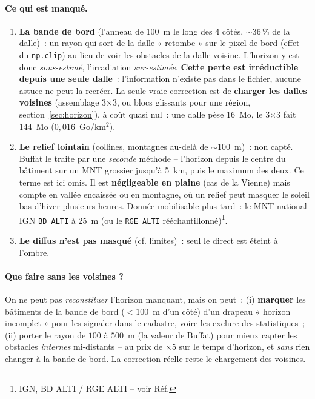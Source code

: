 \documentclass[11pt,a4paper]{article}
\newcommand{\fichier}[1]{\texttt{#1}}
\newcommand{\fonction}[1]{\texttt{#1}}
\begin{document}
\paragraph{Ce qui est manqué.}
\begin{enumerate}
  \item \textbf{La bande de bord} (l'anneau de 100~m le long des 4 côtés,
    $\sim$36\,\% de la dalle)~: un rayon qui sort de la dalle « retombe » sur le
    pixel de bord (effet du \fonction{np.clip}) au lieu de voir les obstacles de
    la dalle voisine. L'horizon y est donc \emph{sous-estimé}, l'irradiation
    \emph{sur-estimée}. \textbf{Cette perte est irréductible depuis une seule
    dalle}~: l'information n'existe pas dans le fichier, aucune astuce ne peut la
    recréer. La seule vraie correction est de \textbf{charger les dalles voisines}
    (assemblage 3$\times$3, ou blocs glissants pour une région,
    section~\ref{sec:horizon}), à coût quasi nul~: une dalle pèse 16~Mo, le
    3$\times$3 fait 144~Mo ($0{,}016$~Go/km$^2$).
  \item \textbf{Le relief lointain} (collines, montagnes au-delà de $\sim$100~m)~:
    non capté. Buffat le traite par une \emph{seconde} méthode -- l'horizon depuis
    le centre du bâtiment sur un MNT grossier jusqu'à 5~km, puis le maximum des
    deux. Ce terme est ici omis. Il est \textbf{négligeable en plaine} (cas de la
    Vienne) mais compte en vallée encaissée ou en montagne, où un relief peut
    masquer le soleil bas d'hiver plusieurs heures. Donnée mobilisable plus tard~:
    le MNT national IGN \fichier{BD ALTI} à 25~m (ou le \fichier{RGE ALTI}
    rééchantillonné)\footnote{IGN, BD ALTI / RGE ALTI -- voir Réf.}.
  \item \textbf{Le diffus n'est pas masqué} (cf. limites)~: seul le direct est
    éteint à l'ombre.
\end{enumerate}

\paragraph{Que faire sans les voisines ?} On ne peut pas \emph{reconstituer}
l'horizon manquant, mais on peut~: (i) \textbf{marquer} les bâtiments de la bande
de bord ($<100$~m d'un côté) d'un drapeau « horizon incomplet » pour les signaler
dans le cadastre, voire les exclure des statistiques~; (ii) porter le rayon de
$100$ à $500$~m (la valeur de Buffat) pour mieux capter les obstacles
\emph{internes} mi-distants -- au prix de $\times 5$ sur le temps d'horizon, et
\emph{sans} rien changer à la bande de bord. La correction réelle reste le
chargement des voisines.
\end{document}
